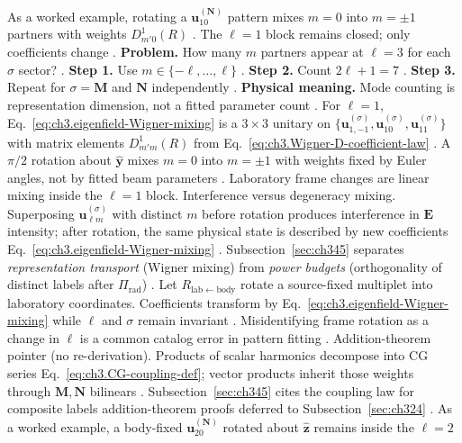 As a worked example, rotating a \(\mathbf{u}_{10}^{(\mathbf{N})}\) pattern mixes \(m=0\) into \(m=\pm1\) partners with weights
\(D_{m'0}^{1}(R)\) \cite{jackson1999}. The \(\ell=1\) block remains closed; only coefficients change
\cite{stratton1941}.
\textbf{Problem.} How many \(m\) partners appear at \(\ell=3\) for each \(\sigma\) sector?
\cite{jackson1999}.
\textbf{Step 1.} Use \(m\in\{-\ell,\ldots,\ell\}\) \cite{jackson1999}.
\textbf{Step 2.} Count \(2\ell+1=7\) \cite{hansen1988}.
\textbf{Step 3.} Repeat for \(\sigma=\mathbf{M}\) and \(\mathbf{N}\) independently \cite{stratton1941}.
\textbf{Physical meaning.} Mode counting is representation dimension, not a fitted parameter count
\cite{harrington2001}.
For \(\ell=1\), Eq.~\eqref{eq:ch3.eigenfield-Wigner-mixing} is a \(3\times3\) unitary on
\(\{\mathbf{u}_{1,-1}^{(\sigma)},\mathbf{u}_{10}^{(\sigma)},\mathbf{u}_{11}^{(\sigma)}\}\) with matrix elements
\(D_{m'm}^{1}(R)\) from Eq.~\eqref{eq:ch3.Wigner-D-coefficient-law} \cite{jackson1999}. A \(\pi/2\) rotation
about \(\hat{\mathbf{y}}\) mixes \(m=0\) into \(m=\pm1\) with weights fixed by Euler angles, not by fitted beam
parameters \cite{stratton1941}. Laboratory frame changes are linear mixing inside the \(\ell=1\) block.
Interference versus degeneracy mixing. Superposing \(\mathbf{u}_{\ell m}^{(\sigma)}\) with distinct \(m\) before rotation produces interference in
\(\mathbf{E}\) intensity; after rotation, the same physical state is described by new coefficients
Eq.~\eqref{eq:ch3.eigenfield-Wigner-mixing} \cite{jackson1999}. Subsection~\ref{sec:ch345} separates
\emph{representation transport} (Wigner mixing) from \emph{power budgets} (orthogonality of distinct labels after
\(\Pi_{\mathrm{rad}}\)) \cite{harrington2001}.
Let \(R_{\mathrm{lab\leftarrow body}}\) rotate a source-fixed multiplet into laboratory coordinates. Coefficients
transform by Eq.~\eqref{eq:ch3.eigenfield-Wigner-mixing} while \(\ell\) and \(\sigma\) remain invariant
\cite{stratton1941}. Misidentifying frame rotation as a change in \(\ell\) is a common catalog error in
pattern fitting \cite{harrington2001}.
Addition-theorem pointer (no re-derivation). Products of scalar harmonics decompose into CG series Eq.~\eqref{eq:ch3.CG-coupling-def}; vector products inherit those
weights through \(\mathbf{M},\mathbf{N}\) bilinears \cite{jackson1999}. Subsection~\ref{sec:ch345} cites the
coupling law for composite labels addition-theorem proofs deferred to Subsection~\ref{sec:ch324}
\cite{hansen1988}.
As a worked example, a body-fixed \(\mathbf{u}_{20}^{(\mathbf{N})}\) rotated about \(\hat{\mathbf{z}}\) remains inside the \(\ell=2\)
